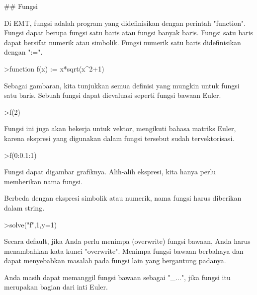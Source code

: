 \documentclass[a4paper,10pt]{article}
\begin{document}
\begin{eulernotebook}
\begin{euleroutput}
  ## Fungsi
  
  Di EMT, fungsi adalah program yang didefinisikan dengan perintah "function". Fungsi dapat berupa fungsi satu baris atau fungsi banyak baris. Fungsi satu baris dapat bersifat numerik atau simbolik. Fungsi numerik satu baris didefinisikan dengan ":=".
  
\end{euleroutput}
\begin{eulerprompt}
>function f(x) := x*sqrt(x^2+1)
\end{eulerprompt}
\begin{euleroutput}
  
  Sebagai gambaran, kita tunjukkan semua definisi yang mungkin untuk fungsi satu baris. Sebuah fungsi dapat dievaluasi seperti fungsi bawaan Euler.
  
\end{euleroutput}
\begin{eulerprompt}
>f(2)
\end{eulerprompt}
\begin{euleroutput}
  
  Fungsi ini juga akan bekerja untuk vektor, mengikuti bahasa matriks Euler, karena ekspresi yang digunakan dalam fungsi tersebut sudah tervektorisasi.
  
\end{euleroutput}
\begin{eulerprompt}
>f(0:0.1:1)
\end{eulerprompt}
\begin{euleroutput}
  
  Fungsi dapat digambar grafiknya. Alih-alih ekspresi, kita hanya perlu memberikan nama fungsi.
  
  Berbeda dengan ekspresi simbolik atau numerik, nama fungsi harus diberikan dalam string.
  
\end{euleroutput}
\begin{eulerprompt}
>solve("f",1,y=1)
\end{eulerprompt}
\begin{euleroutput}
  
  Secara default, jika Anda perlu menimpa (overwrite) fungsi bawaan, Anda harus menambahkan kata kunci "overwrite". Menimpa fungsi bawaan berbahaya dan dapat menyebabkan masalah pada fungsi lain yang bergantung padanya.
  
  Anda masih dapat memanggil fungsi bawaan sebagai "_...", jika fungsi itu merupakan bagian dari inti Euler.
  

\end{euleroutput}
\end{eulernotebook}
\end{document}
